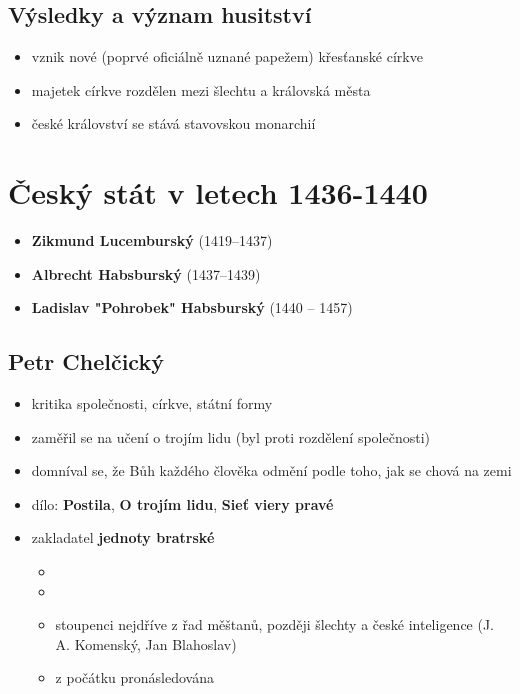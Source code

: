 \subsection{Výsledky a význam husitství}
\begin{itemize}
\item vznik nové (poprvé oficiálně uznané papežem) křesťanské církve
\item majetek církve rozdělen mezi šlechtu a královská města
\item české království se stává stavovskou monarchií
\end{itemize}



\section{Český stát v letech 1436-1440}
\begin{itemize}
\item \textbf{Zikmund Lucemburský} (1419--1437)
\item \textbf{Albrecht Habsburský} (1437--1439)
\item \textbf{Ladislav "Pohrobek" Habsburský} (1440 -- 1457)
\end{itemize}

\subsection{Petr Chelčický}
\begin{itemize}
\item kritika společnosti, církve, státní formy
\item zaměřil se na učení o trojím lidu (byl proti rozdělení společnosti)
\item domníval se, že Bůh každého člověka odmění podle toho, jak se chová na zemi
\item dílo: \textbf{Postila}, \textbf{O trojím lidu}, \textbf{Sieť viery pravé}
\item zakladatel \textbf{jednoty bratrské}
	\begin{itemize}
	\item {}
	\item {}
	\item stoupenci nejdříve z řad měštanů, později šlechty a české inteligence (J. A. Komenský, Jan Blahoslav)
	\item z počátku pronásledována
	\end{itemize}
\end{itemize}



